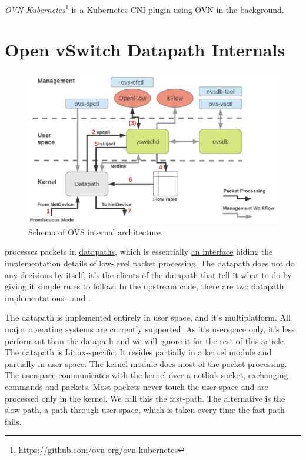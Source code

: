 \emph{OVN-Kubernetes}\footnote{\url{https://github.com/ovn-org/ovn-kubernetes}} is a Kubernetes CNI plugin using OVN in the background. 

\section{Open vSwitch Datapath Internals}
\label{sec:ovs-internals}

\begin{figure}
    \centering
    \includegraphics[width=.9\linewidth]{img/ovs_architecture_01.png}
    \caption{Schema of OVS internal architecture.}
    \label{fig:ovs-arch-schema}
\end{figure}

 processes packets in \href{https://github.com/openvswitch/ovs/blob/e90a0727f17f6ad915a32735a8c0b282f2c8cd6f/lib/dpif.h}{datapaths}, which is essentially \href{https://github.com/openvswitch/ovs/blob/e90a0727f17f6ad915a32735a8c0b282f2c8cd6f/lib/dpif-provider.h\#L107-L117}{an interface} hiding the implementation details of low-level packet processing. The datapath does not do any decisions by itself, it's the clients of the datapath that tell it what to do by giving it simple rules to follow. In the upstream code, there are two datapath implementations - \href{https://github.com/openvswitch/ovs/blob/e90a0727f17f6ad915a32735a8c0b282f2c8cd6f/lib/dpif-netdev.c}{} and \href{https://github.com/openvswitch/ovs/blob/e90a0727f17f6ad915a32735a8c0b282f2c8cd6f/lib/dpif-netlink.c}{}.

The  datapath is implemented entirely in user space, and it's multiplatform. All major operating systems are currently supported. As it's userspace only, it's less performant than the  datapath and we will ignore it for the rest of this article. The  datapath is Linux-specific. It resides partially in a kernel module and partially in user space. The kernel module does most of the packet processing. The userspace communicates with the kernel over a netlink socket, exchanging commands and packets. Most packets never touch the user space and are processed only in the kernel. We call this the fast-path. The alternative is the slow-path, a path through user space, which is taken every time the fast-path fails.


